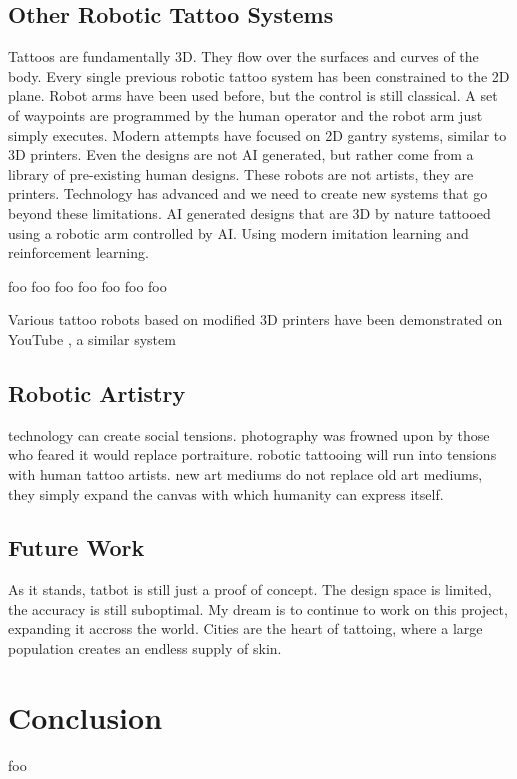 \documentclass[11pt]{article}
\begin{document}
\subsection{Other Robotic Tattoo Systems}

Tattoos are fundamentally 3D.
They flow over the surfaces and curves of the body.
Every single previous robotic tattoo system has been constrained to the 2D plane.
Robot arms have been used before, but the control is still classical.
A set of waypoints are programmed by the human operator and the robot arm just simply executes.
Modern attempts have focused on 2D gantry systems, similar to 3D printers.
Even the designs are not AI generated, but rather come from a library of pre-existing human designs.
These robots are not artists, they are printers.
Technology has advanced and we need to create new systems that go beyond these limitations.
AI generated designs that are 3D by nature tattooed using a robotic arm controlled by AI.
Using modern imitation learning and reinforcement learning.

foo \cite{NietoBastida2023}
foo \cite{arar2025swiftsketch}
foo \cite{carlier2020deepsvg}
foo \cite{mellor2020unsupervised}
foo \cite{ha2017neural}
foo \cite{huang2019learning}
foo \cite{kotani2019teaching}

Various tattoo robots based on modified 3D printers have been demonstrated on YouTube \cite{EmilyTheEngineer2025}, a similar system \cite{YamanDeif2021}

\subsection{Robotic Artistry}

technology can create social tensions.
photography was frowned upon by those who feared it would replace portraiture.
robotic tattooing will run into tensions with human tattoo artists.
new art mediums do not replace old art mediums, they simply expand the canvas with which humanity can express itself.

\subsection{Future Work}

As it stands, tatbot is still just a proof of concept.
The design space is limited, the accuracy is still suboptimal.
My dream is to continue to work on this project, expanding it accross the world.
Cities are the heart of tattoing, where a large population creates an endless supply of skin.

\section{Conclusion}

foo



\end{document}
